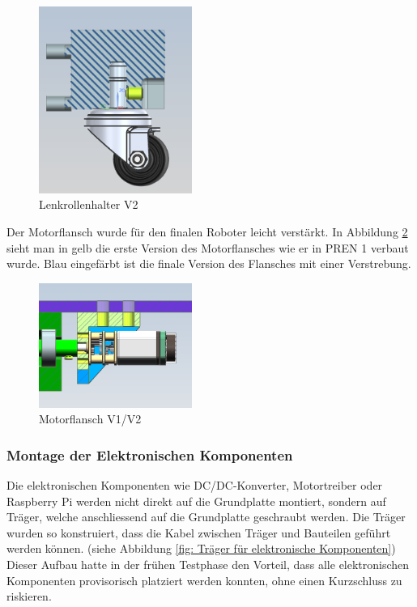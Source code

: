 \begin{figure}[H]
\centering
\includegraphics[width=5cm]{assets/MT/Lenkrollenhalter V2.png}
\caption{Lenkrollenhalter V2}
\label{fig: Lenkrollenhalter V2}
\end{figure}

Der Motorflansch wurde für den finalen Roboter leicht verstärkt. In Abbildung \ref{fig: Motorflansch V1/V2} sieht man in gelb die erste Version des Motorflansches wie er in PREN 1 verbaut wurde. Blau eingefärbt ist die finale Version des Flansches mit einer Verstrebung. 

\begin{figure}[H]
\centering
\includegraphics[width=5cm]{assets/MT/Motorflansch Vergleich.png}
\caption{Motorflansch V1/V2}
\label{fig: Motorflansch V1/V2}
\end{figure}

\subsubsection{Montage der Elektronischen Komponenten}
\label{Montage der Elektronischen Komponenten}

Die elektronischen Komponenten wie DC/DC-Konverter, Motortreiber oder Raspberry Pi werden nicht direkt auf die Grundplatte montiert, sondern auf Träger, welche anschliessend auf die Grundplatte geschraubt werden. Die Träger wurden so konstruiert, dass die Kabel zwischen Träger und Bauteilen geführt werden können. (siehe Abbildung \ref{fig: Träger für elektronische Komponenten}) Dieser Aufbau hatte in der frühen Testphase den Vorteil, dass alle elektronischen Komponenten provisorisch platziert werden konnten, ohne einen Kurzschluss zu riskieren. 

